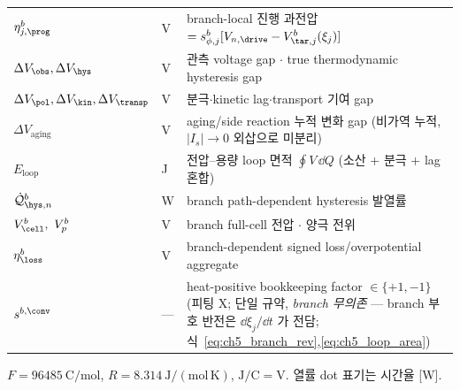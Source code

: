 \begin{longtable}{p{} p{} >{\raggedright\arraybackslash}p{}}
$\eta_{j,\prog}^b$ & V & branch-local 진행 과전압 $=s_{\phi,j}^b[V_{n,\drive}-V_{\tar,j}^b(\xi_j)]$ \\
$\Delta V_\obs,\Delta V_\hys$ & V & 관측 voltage gap $\cdot$ true thermodynamic hysteresis gap \\
$\Delta V_\pol,\Delta V_\kin,\Delta V_\transp$ & V & 분극$\cdot$kinetic lag$\cdot$transport 기여 gap \\
$\Delta V_{\mathrm{aging}}$ & V & aging/side reaction 누적 변화 gap (비가역 누적, $|I_s|\to0$ 외삽으로 미분리) \\
$E_{\mathrm{loop}}$ & J & 전압--용량 loop 면적 $\oint V\,\dd Q$ (소산 + 분극 + lag 혼합) \\
$\dot{\mathcal Q}_{\hys,n}^b$ & W & branch path-dependent hysteresis 발열률 \\
$V_\cell^b,\ V_p^b$ & V & branch full-cell 전압 $\cdot$ 양극 전위 \\
$\eta_\loss^b$ & V & branch-dependent signed loss/overpotential aggregate \\
$s^{b,\conv}$ & --- & heat-positive bookkeeping factor $\in\{+1,-1\}$ (피팅 X; 단일 규약, \emph{branch 무의존} — branch 부호 반전은 $\dd\xi_j/\dd t$ 가 전담; 식~\eqref{eq:ch5_branch_rev},\allowbreak\eqref{eq:ch5_loop_area}) \\
\bottomrule
\end{longtable}
$F=96485\ \mathrm{C/mol}$, $R=8.314\ \mathrm{J/(mol\,K)}$, $\mathrm{J/C}=\mathrm V$. 열률 dot 표기는 시간율 [W].

